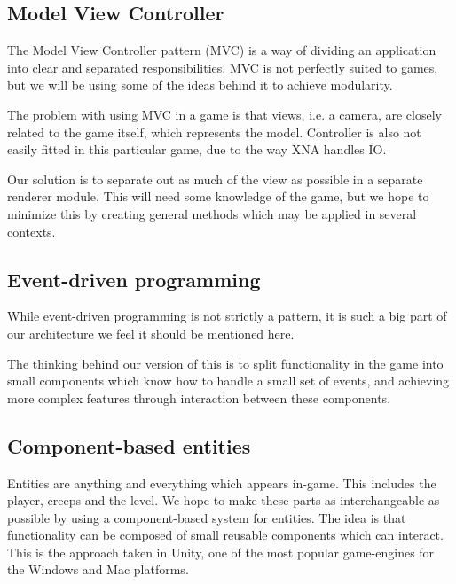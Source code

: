 \subsection{Model View Controller}
The Model View Controller pattern (MVC) is a way of dividing an application
into clear and separated responsibilities. MVC is not perfectly suited to 
games, but we will be using some of the ideas behind it to achieve modularity.

The problem with using MVC in a game is that views, i.e. a camera, are closely
related to the game itself, which represents the model.  Controller is also 
not easily fitted in this particular game, due to the way XNA handles IO.

Our solution is to separate out as much of the view as possible in a separate
renderer module.  This will need some knowledge of the game, but we hope to 
minimize this by creating general methods which may be applied in several 
contexts.

\subsection{Event-driven programming}
While event-driven programming is not strictly a pattern, it is such a big 
part of our architecture we feel it should be mentioned here.

The thinking behind our version of this is to split functionality in the game
into small components which know how to handle a small set of events, and 
achieving more complex features through interaction between these components.

\subsection{Component-based entities}
Entities are anything and everything which appears in-game.  This includes the
player, creeps and the level.  We hope to make these parts as interchangeable 
as possible by using a component-based system for entities.  The idea is that
functionality can be composed of small reusable components which can interact.
This is the approach taken in Unity, one of the most popular game-engines for 
the Windows and Mac platforms\cite{unity}.